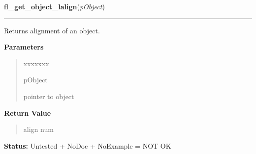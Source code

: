 \hspace{.8\funcindent}\begin{boxedminipage}{\funcwidth}

    \raggedright \textbf{fl\_get\_object\_lalign}(\textit{pObject})

    \vspace{-1.5ex}

    \rule{\textwidth}{0.5\fboxrule}
\setlength{\parskip}{2ex}
    Returns alignment of an object.

\setlength{\parskip}{1ex}
      \textbf{Parameters}
      \vspace{-1ex}

      \begin{quote}
        \begin{Ventry}{xxxxxxx}

          \item[pObject]

          pointer to object

        \end{Ventry}

      \end{quote}

      \textbf{Return Value}
    \vspace{-1ex}

      \begin{quote}
      align num

      \end{quote}

\textbf{Status:} Untested + NoDoc + NoExample = NOT OK



    \end{boxedminipage}

    \label{xformslib:library:fl_set_object_shortcut}

    \vspace{0.5ex}

